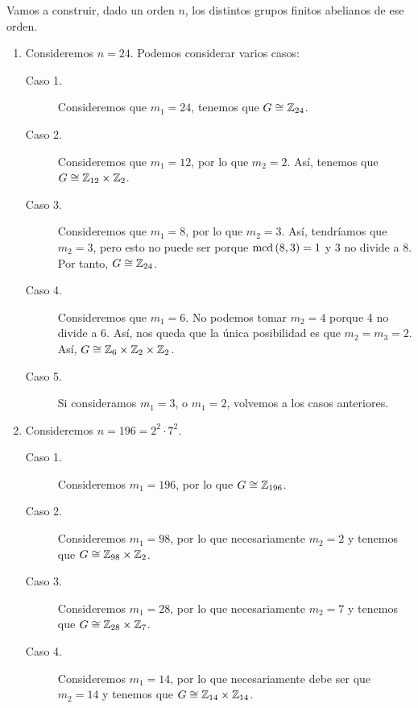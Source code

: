 \begin{eg}
Vamos a construir, dado un orden $\displaystyle n $, los distintos grupos finitos abelianos de ese orden. 
\begin{enumerate}
\item Consideremos $\displaystyle n = 24 $. Podemos considerar varios casos:
	\begin{description}
	\item[Caso 1.] Consideremos que $\displaystyle m_{1} = 24 $, tenemos que $\displaystyle G \cong \mathbb{Z}_{24} $. 
	\item[Caso 2.] Consideremos que $\displaystyle m_{1} = 12 $, por lo que $\displaystyle m_{2} = 2 $. Así, tenemos que $\displaystyle G \cong \mathbb{Z}_{12} \times \mathbb{Z}_{2} $. 
	\item[Caso 3.] Consideremos que $\displaystyle m_{1} = 8 $, por lo que $\displaystyle m_{2} = 3 $. Así, tendríamos que $\displaystyle m_{2} = 3 $, pero esto no puede ser porque $\displaystyle \text{mcd}\left(8,3\right) = 1 $ y 3 no divide a 8. Por tanto, $\displaystyle G \cong \mathbb{Z}_{24} $.
	\item[Caso 4.] Consideremos que $\displaystyle m_{1} = 6 $. No podemos tomar $\displaystyle m_{2} =4 $ porque 4 no divide a 6. Así, nos queda que la única posibilidad es que $\displaystyle m_{2} = m_{3} = 2 $. Así, $\displaystyle G \cong \mathbb{Z}_{6} \times \mathbb{Z}_{2} \times \mathbb{Z}_{2} $.
	\item[Caso 5.] Si consideramos $\displaystyle m_{1}=3 $, o $\displaystyle m_{1}=2 $, volvemos a los casos anteriores. 
	\end{description}
\item Consideremos $\displaystyle n=196 = 2^{2} \cdot 7^{2} $. 
	\begin{description}
	\item[Caso 1.] Consideremos $\displaystyle m_{1} = 196 $, por lo que $\displaystyle G \cong \mathbb{Z}_{196} $.
	\item[Caso 2.] Consideremos $\displaystyle m_{1} = 98 $, por lo que necesariamente $\displaystyle m_{2} = 2 $ y tenemos que $\displaystyle G \cong \mathbb{Z}_{98} \times \mathbb{Z}_{2} $.
	\item[Caso 3.] Consideremos $\displaystyle m_{1} = 28 $, por lo que necesariamente $\displaystyle m_{2} = 7 $ y tenemos que $\displaystyle G \cong \mathbb{Z}_{28} \times \mathbb{Z}_{7} $.
	\item[Caso 4.] Consideremos $\displaystyle m_{1} = 14 $, por lo que necesariamente debe ser que $\displaystyle m_{2} = 14 $ y tenemos que $\displaystyle G \cong \mathbb{Z}_{14} \times \mathbb{Z}_{14} $. 
	\end{description}
\end{enumerate}
\end{eg}
